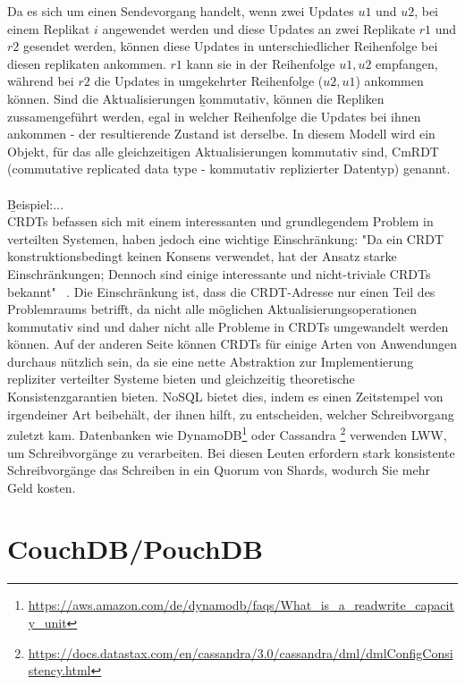 Da es sich um einen Sendevorgang handelt, wenn zwei Updates $u1$ und $u2$, bei einem Replikat $i$ angewendet werden und diese Updates an zwei Replikate $r1$ und $r2$ gesendet werden, können diese Updates in unterschiedlicher Reihenfolge bei diesen replikaten ankommen. $r1$ kann sie in der Reihenfolge $u1, u2$ empfangen, während bei $r2$ die Updates in umgekehrter Reihenfolge ($u2, u1$) ankommen können. Sind die Aktualisierungen \b{kommutativ}, können die Repliken zussamengeführt werden, egal in welcher Reihenfolge die Updates bei ihnen ankommen - der resultierende Zustand ist derselbe. In diesem Modell wird ein Objekt, für das alle gleichzeitigen Aktualisierungen kommutativ sind, CmRDT (commutative replicated data type - kommutativ replizierter Datentyp) genannt. \\\\
\b{Beispiel:...}\\
CRDTs befassen sich mit einem interessanten und grundlegendem Problem in verteilten Systemen, haben jedoch eine wichtige Einschränkung: "Da ein CRDT konstruktionsbedingt keinen Konsens verwendet, hat der Ansatz starke Einschränkungen; Dennoch sind einige interessante und nicht-triviale CRDTs bekannt" ~\cite{crdt_shapiro2}. Die Einschränkung ist, dass die CRDT-Adresse nur einen Teil des Problemraums betrifft, da nicht alle möglichen Aktualisierungsoperationen kommutativ sind und daher nicht alle Probleme in CRDTs umgewandelt werden können. Auf der anderen Seite können CRDTs für einige Arten von Anwendungen durchaus nützlich sein, da sie eine nette Abstraktion zur Implementierung repliziter verteilter Systeme bieten und gleichzeitig theoretische Konsistenzgarantien bieten.
%
%
NoSQL bietet dies, indem es einen Zeitstempel von irgendeiner Art beibehält, der ihnen hilft, zu entscheiden, welcher Schreibvorgang zuletzt kam. Datenbanken wie DynamoDB\footnote{\url{https://aws.amazon.com/de/dynamodb/faqs/What_is_a_readwrite_capacity_unit}} oder Cassandra \footnote{\url{https://docs.datastax.com/en/cassandra/3.0/cassandra/dml/dmlConfigConsistency.html}} verwenden LWW, um Schreibvorgänge zu verarbeiten. Bei diesen Leuten erfordern stark konsistente Schreibvorgänge das Schreiben in ein Quorum von Shards, wodurch Sie mehr Geld kosten.
%
%
\section{CouchDB/PouchDB}
